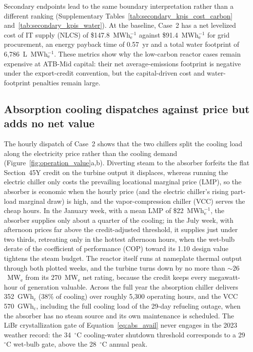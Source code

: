 \documentclass[sn-vancouver,Numbered]{sn-jnl}%
\begin{document}
Secondary endpoints lead to the same boundary interpretation rather than a different ranking (Supplementary Tables~\ref{tab:secondary_kpis_cost_carbon} and~\ref{tab:secondary_kpis_water}). At the baseline, Case~2 has a net levelized cost of IT supply (NLCS) of \$147.8~MWh$_\mathrm{e}^{-1}$ against \$91.4~MWh$_\mathrm{e}^{-1}$ for grid procurement, an energy payback time of 0.57~yr and a total water footprint of 6{,}786~L~MWh$_\mathrm{e}^{-1}$. These metrics show why the low-carbon reactor cases remain expensive at ATB-Mid capital: their net average-emissions footprint is negative under the export-credit convention, but the capital-driven cost and water-footprint penalties remain large.

\subsection{Absorption cooling dispatches against price but adds no net value}
\label{sec:results:cooling}

The hourly dispatch of Case~2 shows that the two chillers split the cooling load along the electricity price rather than the cooling demand (Figure~\ref{fig:operation_value}a,b). Diverting steam to the absorber forfeits the flat Section~45Y credit on the turbine output it displaces, whereas running the electric chiller only costs the prevailing locational marginal price (LMP), so the absorber is economic when the hourly price (and the electric chiller's rising part-load marginal draw) is high, and the vapor-compression chiller (VCC) serves the cheap hours. In the January week, with a mean LMP of \$22~MWh$_\mathrm{e}^{-1}$, the absorber supplies only about a quarter of the cooling; in the July week, with afternoon prices far above the credit-adjusted threshold, it supplies just under two thirds, retreating only in the hottest afternoon hours, when the wet-bulb derate of the coefficient of performance (COP) toward its 1.10 design value tightens the steam budget. The reactor itself runs at nameplate thermal output through both plotted weeks, and the turbine turns down by no more than $\sim 26$~MW$_\mathrm{e}$ from its 270~MW$_\mathrm{e}$ net rating, because the credit keeps every megawatt-hour of generation valuable. Across the full year the absorption chiller delivers 352~GWh$_\mathrm{c}$ (38\% of cooling) over roughly 5{,}300 operating hours, and the VCC 570~GWh$_\mathrm{c}$, including the full cooling load of the 29-day refueling outage, when the absorber has no steam source and its own maintenance is scheduled. The LiBr crystallization gate of Equation~\eqref{eq:abs_avail} never engages in the 2023 weather record: the 34~$^\circ$C cooling-water shutdown threshold corresponds to a 29~$^\circ$C wet-bulb gate, above the 28~$^\circ$C annual peak.
\end{document}
